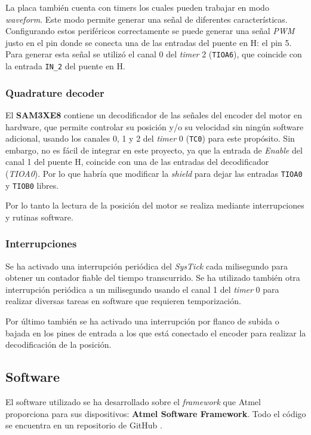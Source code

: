 \documentclass[a4paper]{article}
\begin{document}
La placa también cuenta con timers los cuales pueden trabajar en modo \emph{waveform}.
Este modo permite generar una señal de diferentes características.
Configurando estos periféricos correctamente se puede generar una señal \emph{PWM} justo en el pin donde se conecta una de las entradas del puente en H: el pin 5.
Para generar esta señal se utilizó el canal 0 del \emph{timer} 2 (\texttt{TIOA6}), que coincide con la entrada \texttt{IN\_2} del puente en H.

\subsubsection{Quadrature decoder}
El \textbf{SAM3XE8} contiene un decodificador de las señales del encoder del motor en hardware,
que permite controlar su posición y/o su velocidad sin ningún software adicional, usando los canales 0, 1 y 2 del \emph{timer} 0 (\texttt{TC0}) para este propósito.
Sin embargo, no es fácil de integrar en este proyecto, ya que la entrada de \emph{Enable} del canal 1 del puente H, coincide con una de las entradas del decodificador (\emph{TIOA0}).
Por lo que habría que modificar la \emph{shield} para dejar las entradas \texttt{TIOA0} y \texttt{TIOB0} libres.

Por lo tanto la lectura de la posición del motor se realiza mediante interrupciones y rutinas software.

\subsubsection{Interrupciones \label{int}}
Se ha activado una interrupción periódica del \emph{SysTick} cada milisegundo para obtener un contador fiable del tiempo transcurrido.
Se ha utilizado también otra interrupción periódica a un milisegundo usando el canal 1 del \emph{timer} 0 para realizar diversas tareas en software que requieren temporización.

Por último también se ha activado una interrupción por flanco de subida o bajada en los pines de entrada a los que está conectado el encoder para realizar la decodificación de la posición.

\subsection{Software \label{sec:software}}
El software utilizado se ha desarrollado sobre el \emph{framework} que Atmel proporciona para sus dispositivos: \textbf{Atmel Software Framework}.
Todo el código se encuentra en un repositorio de GitHub \cite{git}.
\end{document}
